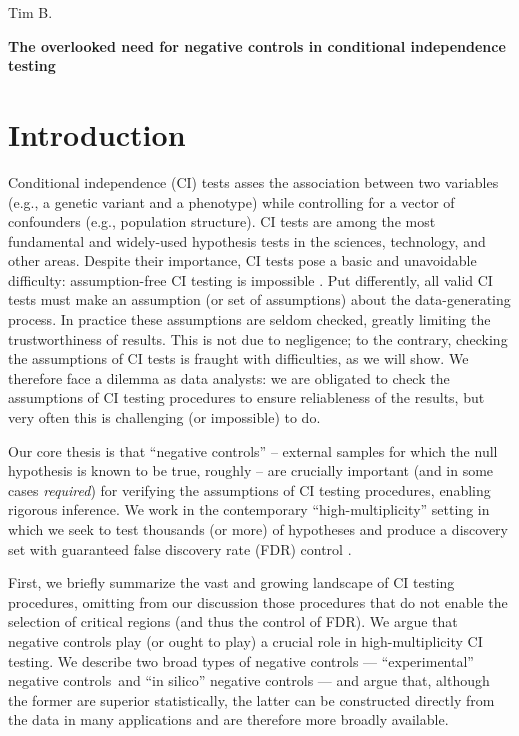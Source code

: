 \documentclass[12pt]{article}
\begin{document}
	\noindent
	Tim B.
	\begin{center}
		\textbf{The overlooked need for negative controls in conditional independence testing}
	\end{center}

\section{Introduction}

Conditional independence (CI) tests asses the association between two variables (e.g., a genetic variant and a phenotype) while controlling for a vector of confounders (e.g., population structure). CI tests are among the most fundamental and widely-used hypothesis tests in the sciences, technology, and other areas. Despite their importance, CI tests pose a basic and unavoidable difficulty: assumption-free CI testing is impossible \parencite{Shah2020,Kim2021}. Put differently, all valid CI tests must make an assumption (or set of assumptions) about the data-generating process. In practice these assumptions are seldom checked, greatly limiting the trustworthiness of results. This is not due to negligence; to the contrary, checking the assumptions of CI tests is fraught with difficulties, as we will show. We therefore face a dilemma as data analysts: we are obligated to check the assumptions of CI testing procedures to ensure reliableness of the results, but very often this is challenging (or impossible) to do.

Our core thesis is that ``negative controls'' -- external samples for which the null hypothesis is known to be true, roughly  -- are crucially important (and in some cases \textit{required}) for verifying the assumptions of CI testing procedures, enabling rigorous inference. We work in the contemporary ``high-multiplicity'' setting in which we seek to test thousands (or more) of hypotheses and produce a discovery set with guaranteed false discovery rate (FDR) control \parencite{Benjamini1995, Li2021}.

First, we briefly summarize the vast and growing landscape of CI testing procedures, omitting from our discussion those procedures that do not enable the selection of critical regions (and thus the control of FDR). We argue that negative controls play (or ought to play) a crucial role in high-multiplicity CI testing. We describe two broad types of negative controls --- ``experimental'' negative controls and ``in silico'' negative controls --- and argue that, although the former are superior statistically, the latter can be constructed directly from the data in many applications and are therefore more broadly available.
\end{document}
